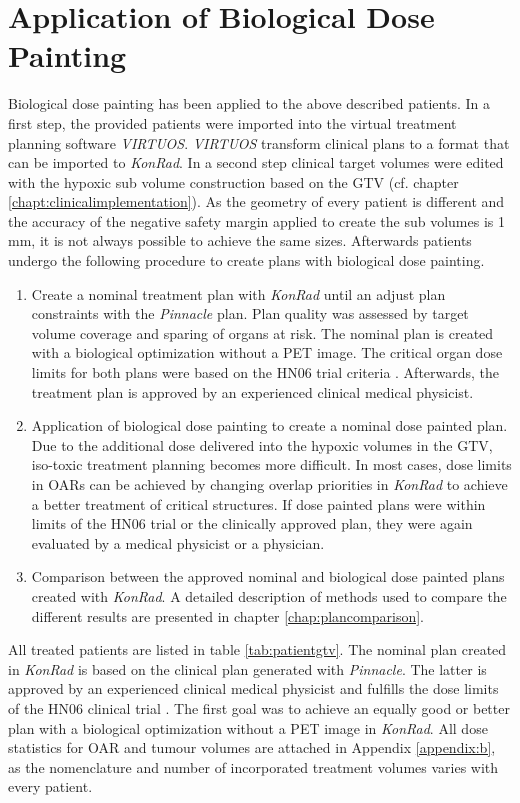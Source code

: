 \section{Application of Biological Dose Painting}
Biological dose painting has been applied to the above described patients. In a first step, the provided patients were imported into the virtual treatment planning software \textit{VIRTUOS}. \textit{VIRTUOS} transform clinical plans to a format that can be imported to \textit{KonRad}. In a second step clinical target volumes were edited with the hypoxic sub volume construction based on the GTV (cf. chapter \ref{chapt:clinicalimplementation}). As the geometry of every patient is different and the accuracy of the negative safety margin applied to create the sub volumes is 1 mm, it is not always possible to achieve the same sizes. Afterwards patients undergo the following procedure to create plans with biological dose painting.
\begin{enumerate}
\item Create a nominal treatment plan with \textit{KonRad} until an adjust plan constraints with the \textit{Pinnacle} plan. Plan quality was assessed by target volume coverage and sparing of organs at risk. The nominal plan is created with a biological optimization without a PET image. The critical organ dose limits for both plans were based on the HN06 trial criteria \cite{HN06}. Afterwards, the treatment plan is approved by an experienced clinical medical physicist.
\item Application of biological dose painting to create a nominal dose painted plan. Due to the additional dose delivered into the hypoxic volumes in the GTV, iso-toxic treatment planning becomes more difficult. In most cases, dose limits in OARs can be achieved by changing overlap priorities in \textit{KonRad} to achieve a better treatment of critical structures. If dose painted plans were within limits of the HN06 trial or the clinically approved plan, they were again evaluated by a medical physicist or a physician.
\item Comparison between the approved nominal and biological dose painted plans created with \textit{KonRad}. A detailed description of methods used to compare the different results are presented in chapter \ref{chap:plancomparison}.
\end{enumerate}
All treated patients are listed in table \ref{tab:patientgtv}. The nominal plan created in \textit{KonRad} is based on the clinical plan generated with \textit{Pinnacle}. The latter is approved by an experienced clinical medical physicist and fulfills the dose limits of the HN06 clinical trial \cite{HN06}. The first goal was to achieve an equally good or better plan with a biological optimization without a PET image in \textit{KonRad}. All dose statistics for OAR and tumour volumes are attached in Appendix \ref{appendix:b}, as the nomenclature and number of incorporated treatment  volumes varies with every patient.
